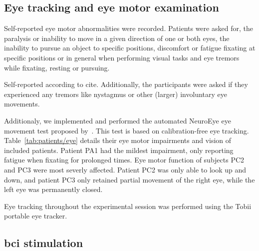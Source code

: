 \subsection{Eye tracking and eye motor examination}

Self-reported eye motor abnormalities were recorded.
Patients were asked for, the paralysis or inability to move in a given
direction of one or both eyes, the inability to pursue an object to specific
positions, discomfort or fatigue fixating at specific positions or in general
when performing visual tasks and eye tremors while fixating, resting or
pursuing.

Self-reported according to cite.
Additionally, the participants were asked if they experienced any tremors like
nystagmus or other (larger) involuntary eye movements.

Additionaly, we implemented and performed the automated NeuroEye eye movement
test proposed by~\textcite{Hassan2022}.
This test is based on calibration-free eye tracking.
Table~\ref{tab:patients/eye} details their eye motor impairments and vision of
included patients.
Patient PA1 had the mildest impairment, only reporting fatigue when fixating
for prolonged times.
Eye motor function of subjects PC2 and PC3 were most severly affected.
Patient PC2 was only able to look up and down, and patient PC3 only retained
partial movement of the right eye, while the left eye was permanently closed.

\begin{table}[t]
  \centering
  \footnotesize
  
  \caption[Vision and eye motor impairment for included patients.]{%
  Vision and eye motor impairment for included patients.
  Eye motor impairment was assessed with a combination of self-reported issues
  by the subject and the NeuroEye~\cite{Hassan2022} test.
  LogMAR: lower is better.}
  \label{tab:patients/eye}
\end{table}

Eye tracking throughout the experimental session was performed using the Tobii~
portable eye tracker.

\subsection{\Ac{bci} stimulation}

